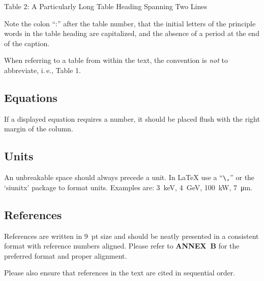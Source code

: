 \begin{justify}
	Table 2: A Particularly Long Table Heading
	Spanning Two Lines
\end{justify}

Note the colon “:” after the table number, that the initial
letters of the principle words in the table heading are
capitalized, and the absence of a period at the end of the
caption.

When referring to a table from within the text, the convention
is \emph{not} to abbreviate, i.\,e., Table 1.

\subsection{Equations}

If a displayed equation requires a number, it should be
placed flush with the right margin of the column. 

\subsection{Units}

An unbreakable space should always precede a unit. In \LaTeX{} use
a “\verb|\,|” or the ‘siunitx’ package to format units.
Examples are:
\SI{3}{keV}, \SI{4}{GeV}, \SI{100}{kW}, \SI{7}{\micro m}.

\subsection{References}

References are written in \SI{9}{pt} size and should be neatly
presented in a consistent format with reference numbers
aligned. Please refer to \textbf{ANNEX~B} for the preferred format
and proper alignment.

Please also ensure that references in the text are cited in
sequential order.

\flushend
